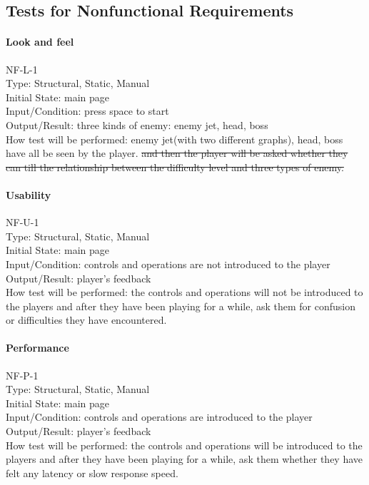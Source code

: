 \documentclass[12pt, titlepage]{article}
\begin{document}
\subsection{Tests for Nonfunctional Requirements}
\paragraph{Look and feel\\}
{\color{red}NF-L-1}\\
Type: Structural, Static, Manual\\
Initial State: main page\\
Input/Condition: press space to start\\
Output/Result: three kinds of enemy: enemy jet, head, boss\\
How test will be performed: enemy jet{\color{red}(with two different graphs)}, head, boss have all be seen by the player.\sout{ and then the player will be asked whether they can till the relationship between the difficulty level and three types of enemy.}
\paragraph{Usability\\}
{\color{red}NF-U-1}\\
Type: Structural, Static, Manual\\
Initial State: main page \\
Input/Condition: controls and operations are not introduced to the player\\
Output/Result: player's feedback\\
How test will be performed: the controls and operations will not be introduced to the players and after they have been playing for a while, ask them for confusion or difficulties they have encountered.
\paragraph{Performance\\}
{\color{red}NF-P-1}\\
Type: Structural, Static, Manual\\
Initial State: main page \\
Input/Condition: controls and operations are introduced to the player\\
Output/Result: player's feedback\\
How test will be performed: the controls and operations will be introduced to the players and after they have been playing for a while, ask them whether they have felt any latency or slow response speed.
\end{document}
